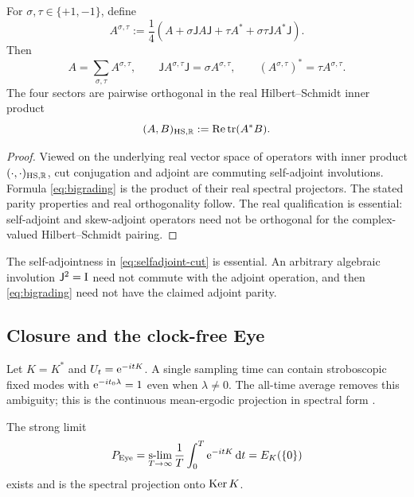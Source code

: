 \begin{theorem}
For $\sigma,\tau\in\{+1,-1\}$, define
\begin{equation}
A^{\sigma,\tau}
:=\frac14\left(
A+\sigma\mathsf J A\mathsf J
+\tau A^*
+\sigma\tau\mathsf J A^*\mathsf J
\right).
\label{eq:bigrading}
\end{equation}
Then
\[
A=\sum_{\sigma,\tau}A^{\sigma,\tau},
\qquad
\mathsf J A^{\sigma,\tau}\mathsf J=\sigma A^{\sigma,\tau},
\qquad
(A^{\sigma,\tau})^*=\tau A^{\sigma,\tau}.
\]
The four sectors are pairwise orthogonal in the real Hilbert--Schmidt inner product
\[
(A,B)_{\mathrm{HS},\mathbb R}:=\operatorname{Re}\operatorname{tr}(A^*B).
\]
\end{theorem}

\begin{proof}
Viewed on the underlying real vector space of operators with inner product $(\cdot,\cdot)_{\mathrm{HS},\mathbb R}$, cut conjugation and adjoint are commuting self-adjoint involutions.  Formula \eqref{eq:bigrading} is the product of their real spectral projectors.  The stated parity properties and real orthogonality follow.  The real qualification is essential: self-adjoint and skew-adjoint operators need not be orthogonal for the complex-valued Hilbert--Schmidt pairing.
\end{proof}

\begin{remark}
The self-adjointness in \eqref{eq:selfadjoint-cut} is essential.  An arbitrary algebraic involution $\mathsf J^2=\mathrm I$ need not commute with the adjoint operation, and then \eqref{eq:bigrading} need not have the claimed adjoint parity.
\end{remark}

\subsection{Closure and the clock-free Eye}

Let $K=K^*$ and $U_t=\mathrm e^{-itK}$.  A single sampling time can contain stroboscopic fixed modes with $\mathrm e^{-it_0\lambda}=1$ even when $\lambda\ne0$.  The all-time average removes this ambiguity; this is the continuous mean-ergodic projection in spectral form \cite{ReedSimon}.

\begin{theorem}
The strong limit
\begin{equation}
P_{\mathrm{Eye}}
=\operatorname*{s-lim}_{T\to\infty}
\frac1T\int_0^T\mathrm e^{-itK}\,\mathrm d t
=E_K(\{0\})
\label{eq:eye}
\end{equation}
exists and is the spectral projection onto $\operatorname{Ker} K$.
\end{theorem}


